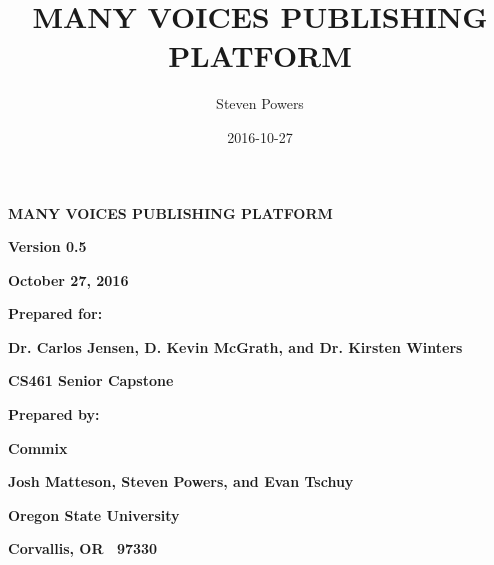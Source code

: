 \documentclass[letterpaper, 10pt, draftclsnofoot, onecolumn]{IEEEtran}
\title{MANY VOICES PUBLISHING PLATFORM}
\author{Steven Powers}
\date{2016-10-27}
\begin{document}
\clearpage\setcounter{page}{1}\pagestyle{Standard}
\thispagestyle{FirstPage}


\bigskip


\bigskip



\bigskip

{\centering{}\bfseries\color{black}
MANY VOICES PUBLISHING PLATFORM
\par}


\bigskip


\bigskip


\bigskip


\bigskip

{\centering{}\bfseries\color{black}
Version 0.5
\par}

{\centering{}\bfseries\color{black}
October 27, 2016
\par}


\bigskip


\bigskip

{\centering{}\bfseries\color{black}
Prepared for:
\par}

{\centering{}\bfseries\color{black}
Dr. Carlos Jensen, D. Kevin McGrath, and Dr. Kirsten Winters
\par}

{\centering{}\bfseries\color{black}
CS461 Senior Capstone
\par}


\bigskip


\bigskip

{\centering{}\bfseries\color{black}
Prepared by:
\par}

{\centering{}\bfseries\color{black}
Commix
\par}

{\centering{}\bfseries\color{black}
Josh Matteson, Steven Powers, and Evan Tschuy
\par}

{\centering{}\bfseries\color{black}
Oregon State University
\par}

{\centering{}\bfseries\color{black}
Corvallis, OR \ 97330
\par}
\end{document}
